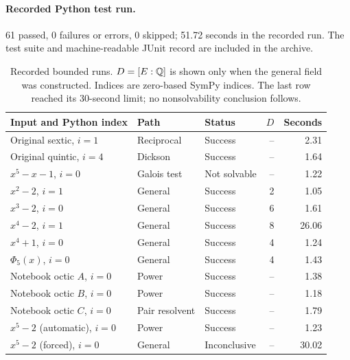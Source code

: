 \paragraph{Recorded Python test run.}
61 passed, 0 failures or errors, 0 skipped; 51.72 seconds in the recorded run. The test suite and machine-readable JUnit record are included in the archive.
\begin{table}[htbp]
\centering\small
\begin{tabularx}{\textwidth}{@{}X l l r r@{}}
\toprule
Input and Python index & Path & Status & $D$ & Seconds\\
\midrule
Original sextic, $i=1$ & Reciprocal & Success & -- & 2.31\\
Original quintic, $i=4$ & Dickson & Success & -- & 1.64\\
$x^5-x-1$, $i=0$ & Galois test & Not solvable & -- & 1.22\\
$x^2-2$, $i=1$ & General & Success & 2 & 1.05\\
$x^3-2$, $i=0$ & General & Success & 6 & 1.61\\
$x^4-2$, $i=1$ & General & Success & 8 & 26.06\\
$x^4+1$, $i=0$ & General & Success & 4 & 1.24\\
$\Phi_5(x)$, $i=0$ & General & Success & 4 & 1.43\\
Notebook octic $A$, $i=0$ & Power & Success & -- & 1.38\\
Notebook octic $B$, $i=0$ & Power & Success & -- & 1.18\\
Notebook octic $C$, $i=0$ & Pair resolvent & Success & -- & 1.79\\
$x^5-2$ (automatic), $i=0$ & Power & Success & -- & 1.23\\
$x^5-2$ (forced), $i=0$ & General & Inconclusive & -- & 30.02\\
\bottomrule
\end{tabularx}
\caption{Recorded bounded runs. $D=[E:\mathbb Q]$ is shown only when the general field was constructed. Indices are zero-based SymPy indices. The last row reached its 30-second limit; no nonsolvability conclusion follows.}
\label{tab:benchmark}
\end{table}
